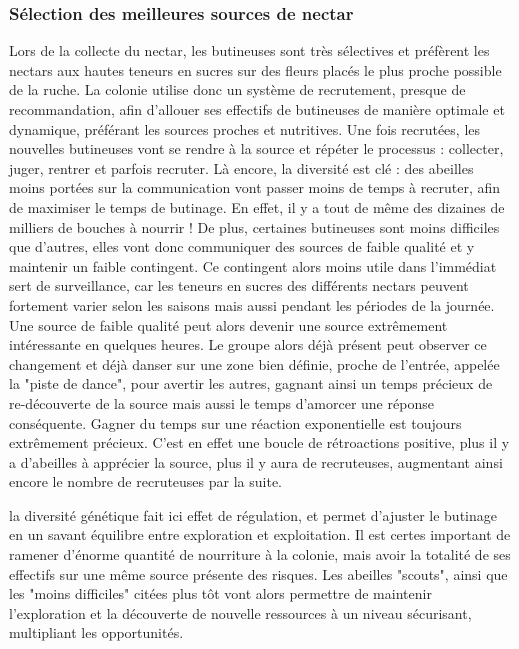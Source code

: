 			\subsubsection{Sélection des meilleures sources de nectar}
			Lors de la collecte du nectar, les butineuses sont très sélectives et préfèrent les nectars aux hautes teneurs en sucres sur des fleurs placés le plus proche possible de la ruche. La colonie utilise donc un système de recrutement, presque de recommandation, afin d'allouer ses effectifs de butineuses de manière optimale et dynamique, préférant les sources proches et nutritives.
			Une fois recrutées, les nouvelles butineuses vont se rendre à la source et répéter le processus : collecter, juger, rentrer et parfois recruter. Là encore, la diversité est clé : des abeilles moins portées sur la communication vont passer moins de temps à recruter, afin de maximiser le temps de butinage. En effet, il y a tout de même des dizaines de milliers de bouches à nourrir ! De plus, certaines butineuses sont moins difficiles que d'autres, elles vont donc communiquer des sources de faible qualité et y maintenir un faible contingent. Ce contingent alors moins utile dans l'immédiat sert de surveillance, car les teneurs en sucres des différents nectars peuvent fortement varier selon les saisons mais aussi pendant les périodes de la journée. Une source de faible qualité peut alors devenir une source extrêmement intéressante en quelques heures. Le groupe alors déjà présent peut observer ce changement et déjà danser sur une zone bien définie, proche de l'entrée, appelée la "piste de dance", pour avertir les autres, gagnant ainsi un temps précieux de re-découverte de la source mais aussi le temps d'amorcer une réponse conséquente. Gagner du temps sur une réaction exponentielle est toujours extrêmement précieux. C'est en effet une boucle de rétroactions positive, plus il y a d'abeilles à apprécier la source, plus il y aura de recruteuses, augmentant ainsi encore le nombre de recruteuses par la suite.
			
			la diversité génétique fait ici effet de régulation, et permet d'ajuster le butinage en un savant équilibre entre exploration et exploitation. Il est certes important de ramener d'énorme quantité de nourriture à la colonie, mais avoir la totalité de ses effectifs sur une même source présente des risques. Les abeilles "scouts", ainsi que les "moins difficiles" citées plus tôt vont alors permettre de maintenir l'exploration et la découverte de nouvelle ressources à un niveau sécurisant, multipliant les opportunités.
			
